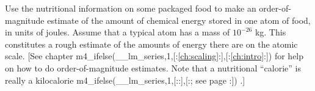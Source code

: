 Use the nutritional information on some packaged food to
make an order-of-magnitude estimate of the amount of
chemical energy stored in one atom of food, in units of
joules. Assume that a typical atom has a mass of $10^{-26}$
kg. This constitutes a rough estimate of the amounts of
energy there are on the atomic scale. [See 
chapter m4_ifelse(__lm_series,1,[:\ref{ch:scaling}:],[:\ref{ch:intro}:])
for help on how to do order-of-magnitude
estimates. Note that a nutritional ``calorie'' is really a
kilocalorie%
m4_ifelse(__lm_series,1,[::],[:; see page \pageref{nonmetricunits}:])%
.]\answercheck
